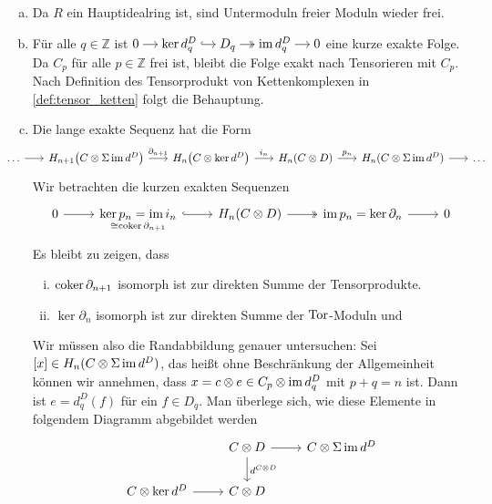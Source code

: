 \begin{beweis}
	\leavevmode
	\begin{enumerate}[a)]
		\item Da $R$ ein Hauptidealring ist, sind Untermoduln freier Moduln wieder frei.
		\item Für alle $q \in \mathbb{Z}$ ist 
		\(
			\begin{tikzcd}[cramped,sep=small]
				0 \rar & \ker d_q^D \rar[hook] & D_q \rar[two heads] & \im d_q^D \rar & 0 
			\end{tikzcd}
		\)
		eine kurze exakte Folge.
		Da $C_p$ für alle $p \in \mathbb{Z}$ frei ist, bleibt die Folge exakt nach Tensorieren mit $C_p$.
		Nach Definition des Tensorprodukt von Kettenkomplexen in \autoref{def:tensor_ketten} folgt die Behauptung.
		\item Die lange exakte Sequenz hat die Form
		\[
			\hspace{-1cm}\begin{tikzcd}[sep=1.7em,font={\fontsize{9.7}{11}\selectfont}]
				\ldots \rar & H_{n+1} \enbrace*{C \otimes \Sigma \im d^D} \rar["\partial_{n+1}"] & H_n \enbrace*{C \otimes \ker d^D} \rar["i_n"] & H_n(C \otimes D) \rar["p_n"] & H_n (C \otimes \Sigma \im d^D) \rar &  \ldots 
			\end{tikzcd}
		\]
		Wir betrachten die kurzen exakten Sequenzen
		\[
			\begin{tikzcd}
				0 \rar & \underset{{\cong \coker \partial_{n+1}}}{\ker p_n = \im i_n}  \rar[hook] & H_n(C \otimes D) \rar[two heads] & \im p_n=\ker \partial_n \rar  & 0
			\end{tikzcd}
		\]
		Es bleibt zu zeigen, dass 
		\begin{enumerate}[(i),itemsep=0pt]
			\item $\operatorname{coker} \partial_{n+1}$ isomorph ist zur direkten Summe der Tensorprodukte.
			\item $\ker \partial_n$ isomorph ist zur direkten Summe der $\operatorname{Tor}$-Moduln und
		\end{enumerate}
		Wir müssen also die Randabbildung genauer untersuchen:
		Sei $[x] \in H_n(C \otimes \Sigma \operatorname{im} d^D)$, das heißt ohne Beschränkung der Allgemeinheit können wir annehmen, dass $x=c \otimes e \in C_p \otimes  \operatorname{im} d_q^D$ mit $p+q=n$ ist.
		Dann ist $e= d_q^D(f)$ für ein $f \in D_q$.
		Man überlege sich, wie diese Elemente in folgendem Diagramm abgebildet werden
		\[
			\begin{tikzcd}
				& C \otimes D \rar \dar["d^{C \otimes D}"] & C \otimes \Sigma \im d^D \\
				C \otimes \ker d^D \rar & C \otimes D

\end{tikzcd}\]
\end{enumerate}
\end{beweis}
